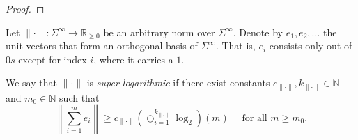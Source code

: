 \begin{lemma}
	
\end{lemma}
\begin{proof}
\end{proof}

\begin{definition}
	\label{def:super-log-norm}
	Let $\lVert \cdot \rVert:\Sigma^{\infty}\to\mathbb{R}_{\geq 0}$ be an arbitrary norm over $\Sigma^{\infty}$.
	Denote by $e_1,e_2,\dots$ the unit vectors that form an orthogonal basis of $\Sigma^{\infty}$. That is, $e_i$ consists only out of $0s$ except for index $i$, where it carries a $1$.
	
	
	We say that $\lVert \cdot \rVert$ is \textit{super-logarithmic} if there exist constants $c_{\lVert\cdot\rVert},k_{\lVert\cdot\rVert}\in\mathbb{N}$ and $m_0\in\mathbb{N}$ such that 
	\begin{equation}
		\left\lVert \sum_{i=1}^{m}e_i \right\rVert\geq c_{\lVert\cdot\rVert}\left(\bigcirc_{i=1}^{k_{\lVert\cdot\rVert}}\log_2\right)(m) \quad \text{ for all } m\geq m_0.  
	\end{equation}
\end{definition}

